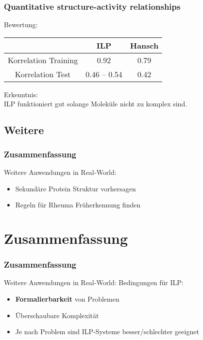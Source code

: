 \begin{frame}
	\frametitle{Quantitative structure-activity relationships}
	Bewertung:
	\begin{center}
		\begin{tabular}{|c|c|c|}
			\hline
			& ILP & Hansch\\
			\hline
			Korrelation Training & 0.92 & 0.79\\
			\hline
			Korrelation Test     & 0.46 -- 0.54 & 0.42\\
			\hline
		\end{tabular}
		\end{center}
		Erkenntnis:\\
		ILP funktioniert gut solange Moleküle nicht zu komplex sind.
\end{frame}

\subsection{Weitere}
\begin{frame}
	\frametitle{Zusammenfassung}
	Weitere Anwendungen in Real-World:
	\begin{itemize}
		\item Sekundäre Protein Struktur vorhersagen
		\item Regeln für Rheuma Früherkennung finden
	\end{itemize}
\end{frame}

\section{Zusammenfassung}
\begin{frame}
	\frametitle{Zusammenfassung}
	Weitere Anwendungen in Real-World:
	Bedingungen für ILP:
	\begin{itemize}
		\item \textbf{Formalierbarkeit} von Problemen
		\item Überschaubare Komplexität
		\item Je nach Problem sind ILP-Systeme besser/schlechter geeignet
	\end{itemize}
\end{frame}

